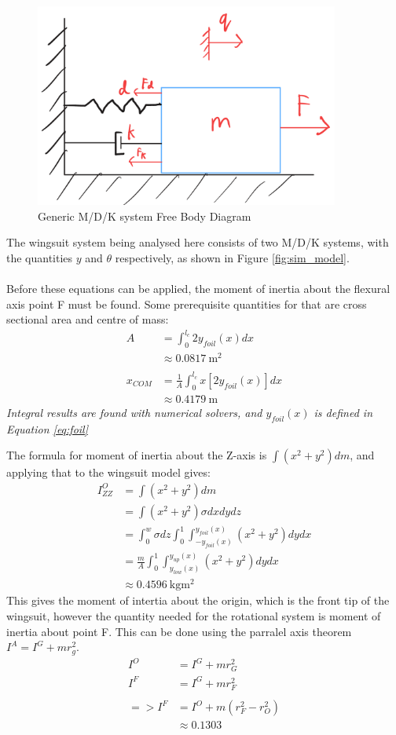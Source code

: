 \documentclass[11pt]{article}
\begin{document}
\begin{figure}[h!]
  \centering
  \includegraphics[width=100mm]{FBD.png}
  \caption{Generic M/D/K system Free Body Diagram}\label{fig:fbd}
\end{figure}
The wingsuit system being analysed here consists of two M/D/K systems, with the quantities $y$ and $\theta$ respectively, as shown in Figure \ref{fig:sim_model}.
\\\\
Before these equations can be applied, the moment of inertia about the flexural axis point F must be found.
Some prerequisite quantities for that are cross sectional area and centre of mass:
\begin{align*}
  A &= \int_0^{l_c}2y_{foil}(x)dx \\
    &\approx 0.0817~\mathrm{m^2} \\\\
  x_{COM} &=\frac{1}{A}\int_0^{l_c}x[2y_{foil}(x)]dx\\
    &\approx 0.4179~\mathrm{m}
\end{align*}
\textsl{Integral results are found with numerical solvers, and $y_{foil}(x)$ is defined in Equation \ref{eq:foil}}

\pagebreak
The formula for moment of inertia about the Z-axis is $\int(x^2+y^2)dm$, and applying that to the wingsuit model gives:
\begin{align*}
	I_{ZZ}^O &= \int(x^2+y^2)dm \\
    &= \int(x^2+y^2)\sigma dxdydz \\
    &= \int_0^w\sigma dz \int_0^1\int_{-y_{foil}(x)}^{y_{foil}(x)}(x^2+y^2)dydx \\
    &= \frac{m}{A}\int_0^1\int_{y_{low}(x)}^{y_{up}(x)}(x^2+y^2)dydx \\
    &\approx 0.4596~\mathrm{kgm^2}
\end{align*}
This gives the moment of intertia about the origin, which is the front tip of the wingsuit, however the quantity needed for the rotational system is moment of inertia about point F. This can be done using the parralel axis theorem $I^A=I^G+mr_g^2$.
\begin{align*}
  I^O &= I^G + mr_G^2 \\
  I^F &= I^G + mr_F^2 \\\\
  => I^F &= I^O + m(r_F^2-r_O^2) \\
    &\approx 0.1303
\end{align*}
\end{document}
